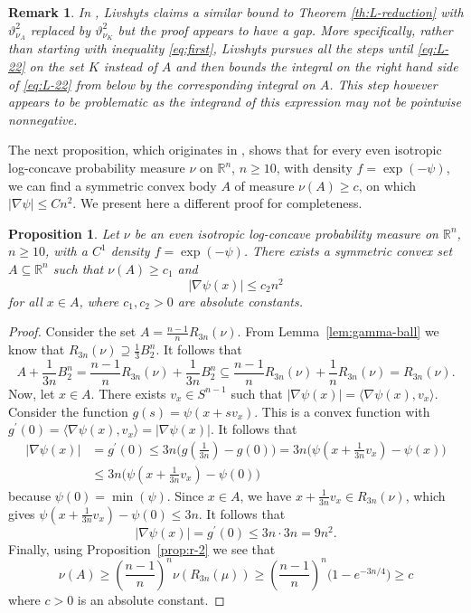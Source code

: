 \documentclass[11pt,leqno]{article}
\newtheorem{proposition}[theorem]{Proposition}
\newtheorem{remark}[theorem]{Remark}
\theoremstyle{definition}
\theoremstyle{remark}
\numberwithin{equation}{section}
\newcommand{\ls}{\leqslant}
\newcommand{\gr}{\geqslant}
\newcommand{\1}{\textbf{1}}
\begin{document}
\begin{remark}\label{rem:1}\rm 
In \cite[Proposition~4.2]{Livshyts-2023}, Livshyts claims a similar bound to Theorem \ref{th:L-reduction} with $\vartheta_{\nu_A}^2$ replaced by $\vartheta_{\nu_K}^2$ but the proof appears to have a gap. More specifically, rather than starting with inequality \eqref{eq:first}, Livshyts pursues all the steps until \eqref{eq:L-22} on the set $K$ instead of $A$ and then bounds the integral on the right hand side of \eqref{eq:L-22} from below by the corresponding integral on $A$. This step however appears to be problematic as the integrand of this expression may not be pointwise nonnegative.
\end{remark}

The next proposition, which originates in \cite[Corollary~4.6]{Livshyts-2023}, shows that for every even isotropic log-concave probability measure $\nu$ on $\mathbb{R}^n$, $n\gr 10$, with
density $f=\exp(-\psi)$, we can find a symmetric convex body $A$ of measure $\nu(A)\gr c$, on which $|\nabla\psi|\ls Cn^2$. We present here a different proof for completeness.


\begin{proposition}\label{prop:large-set}Let $\nu$ be an even isotropic log-concave probability measure on $\mathbb{R}^n$, $n\gr 10$, with
a $C^1$ density $f=\exp(-\psi)$. There exists a symmetric convex set $A\subseteq\mathbb{R}^n$ such that $\nu(A)\gr c_1$ and
$$|\nabla\psi(x)|\ls c_2n^2$$
for all $x\in A$, where $c_1,c_2>0$ are absolute constants.
\end{proposition}

\begin{proof}Consider the set $A=\frac{n-1}{n}R_{3n}(\nu)$. From Lemma~\ref{lem:gamma-ball} we know that $R_{3n}(\nu)\supseteq\frac{1}{3}B_2^n$. It follows that
$$A+\frac{1}{3n}B_2^n=\frac{n-1}{n}R_{3n}(\nu)+\frac{1}{3n}B_2^n\subseteq \frac{n-1}{n}R_{3n}(\nu)+\frac{1}{n}R_{3n}(\nu)=R_{3n}(\nu).$$
Now, let $x\in A$. There exists $v_x\in S^{n-1}$ such that $|\nabla\psi(x)|=\langle\nabla\psi(x),v_x\rangle $. Consider the function
$g(s)=\psi(x+sv_x)$. This is a convex function with $g^{\prime}(0)=\langle\nabla\psi(x),v_x\rangle=|\nabla\psi(x)|$. It follows that
\begin{align*}|\nabla\psi(x)| &=g^{\prime}(0)\ls 3n\big(g\left(\tfrac{1}{3n}\right)-g(0)\big)=3n\big(\psi\left(x+\tfrac{1}{3n}v_x\right)-\psi(x)\big)\\
&\ls 3n\big(\psi\left(x+\tfrac{1}{3n}v_x\right)-\psi (0)\big)
\end{align*}
because $\psi(0)=\min(\psi)$. Since $x\in A$, we have $x+\tfrac{1}{3n}v_x\in R_{3n}(\nu)$, which gives $\psi\left(x+\tfrac{1}{3n}v_x\right)-\psi (0)\ls 3n$. 
It follows that
$$|\nabla\psi(x)|=g^{\prime}(0)\ls 3n\cdot 3n= 9n^2.$$
Finally, using Proposition~\ref{prop:r-2} we see that
$$\nu(A)\gr \left(\frac{n-1}{n}\right)^n\nu(R_{3n}(\mu))\gr \left(\frac{n-1}{n}\right)^n\big(1-e^{-3n/4}\big) \gr c$$
where $c>0$ is an absolute constant.\end{proof}
\end{document}
